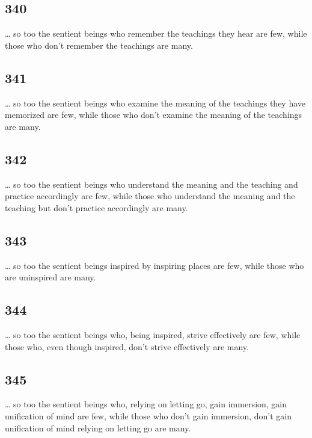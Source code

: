 \documentclass[12pt,openany]{book}%
\begin{document}
\subsection*{340 }

… so too the sentient beings who remember the teachings they hear are few, while those who don’t remember the teachings are many. 

\subsection*{341 }

… so too the sentient beings who examine the meaning of the teachings they have memorized are few, while those who don’t examine the meaning of the teachings are many. 

\subsection*{342 }

… so too the sentient beings who understand the meaning and the teaching and practice accordingly are few, while those who understand the meaning and the teaching but don’t practice accordingly are many. 

\subsection*{343 }

… so too the sentient beings inspired by inspiring places are few, while those who are uninspired are many. 

\subsection*{344 }

… so too the sentient beings who, being inspired, strive effectively are few, while those who, even though inspired, don’t strive effectively are many. 

\subsection*{345 }

… so too the sentient beings who, relying on letting go, gain immersion, gain unification of mind are few, while those who don’t gain immersion, don’t gain unification of mind relying on letting go are many. 
\end{document}
